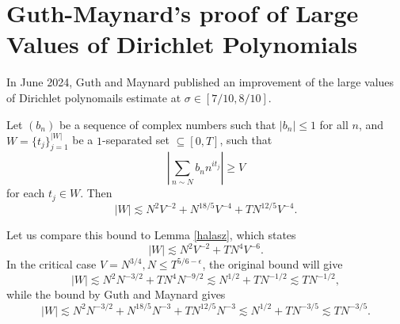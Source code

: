 \section{Guth-Maynard's proof of Large Values of Dirichlet Polynomials}
In June 2024, Guth and Maynard published an improvement of the large values of Dirichlet polynomails estimate at $\sigma\in[7/10,8/10]$.
\begin{theorem}
    Let $(b_n)$ be a sequence of complex numbers such that $|b_n|\leq 1$ for all $n$, and $W=\{t_j\}_{j=1}^{|W|}$ be a $1$-separated set $\subseteq [0,T]$, such that \[
    \left|\sum_{n\sim N}b_n n^{it_j}\right|\geq V
    \]
    for each $t_j\in W$. Then \[
    |W|\lesssim N^2V^{-2}+N^{18/5}V^{-4}+TN^{12/5}V^{-4}.
    \]
\end{theorem}
Let us compare this bound to Lemma \ref{halasz}, which states \[
|W|\lesssim N^2V^{-2}+TN^4V^{-6}.
\]
In the critical case $V=N^{3/4}, N\leq T^{5/6-\epsilon}$, the original bound will give \[
|W|\lesssim N^2N^{-3/2}+TN^4N^{-9/2}\lesssim N^{1/2}+ TN^{-1/2}\lesssim TN^{-1/2},
\]
while the bound by Guth and Maynard gives \[
|W|\lesssim N^2N^{-3/2}+N^{18/5}N^{-3}+TN^{12/5}N^{-3}\lesssim N^{1/2}+TN^{-3/5}\lesssim TN^{-3/5}.
\]
